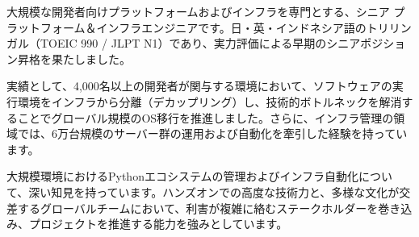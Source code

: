 

\begin{cvparagraph}

大規模な開発者向けプラットフォームおよびインフラを専門とする、シニア プラットフォーム＆インフラエンジニアです。日・英・インドネシア語のトリリンガル（TOEIC 990 / JLPT N1）であり、実力評価による早期のシニアポジション昇格を果たしました。

実績として、4,000名以上の開発者が関与する環境において、ソフトウェアの実行環境をインフラから分離（デカップリング）し、技術的ボトルネックを解消することでグローバル規模のOS移行を推進しました。さらに、インフラ管理の領域では、6万台規模のサーバー群の運用および自動化を牽引した経験を持っています。

大規模環境におけるPythonエコシステムの管理およびインフラ自動化について、深い知見を持っています。ハンズオンでの高度な技術力と、多様な文化が交差するグローバルチームにおいて、利害が複雑に絡むステークホルダーを巻き込み、プロジェクトを推進する能力を強みとしています。
\end{cvparagraph}
